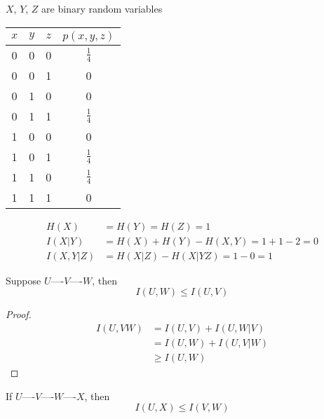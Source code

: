 \begin{example}
    $X$, $Y$, $Z$ are binary random variables
    \begin{center}
        \begin{tabular}{ccc||c}
            $x$ & $y$ & $z$ & $p(x,y,z)$\\
            \hline
            0 & 0 & 0 & $\frac{1}{4}$\\
            0 & 0 & 1 & 0\\
            0 & 1 & 0 & 0\\
            0 & 1 & 1 & $\frac{1}{4}$\\
            1 & 0 & 0 & 0\\
            1 & 0 & 1 & $\frac{1}{4}$\\
            1 & 1 & 0 & $\frac{1}{4}$\\
            1 & 1 & 1 & 0\\
        \end{tabular}
    \end{center}
    
    \[
        \begin{aligned}
            H(X) &= H(Y) = H(Z) = 1\\
            I(X\vert Y) &= H(X) + H(Y) - H(X,Y) = 1 + 1 - 2 = 0\\
            I(X,Y\vert Z) &= H(X\vert Z) - H(X \vert YZ) = 1 - 0 = 1
        \end{aligned}
    \]
\end{example}

\begin{theorem}
    Suppose $U \text{----} V \text{----} W$, then
    \[
        I(U,W) \leqslant I(U,V)    
    \]
\end{theorem}
\begin{proof}
    \[
        \begin{aligned}
            I(U, VW) &= I(U,V) + I(U,W\vert V)\\
            &= I(U,W) + I(U,V \vert W)\\
            &\geqslant I(U,W)
        \end{aligned}            
    \]
\end{proof}

\begin{corollary}
    If $U \text{----} V \text{----} W \text{----} X$, then
    \[
        I(U,X) \leqslant I(V,W)    
    \]
\end{corollary}